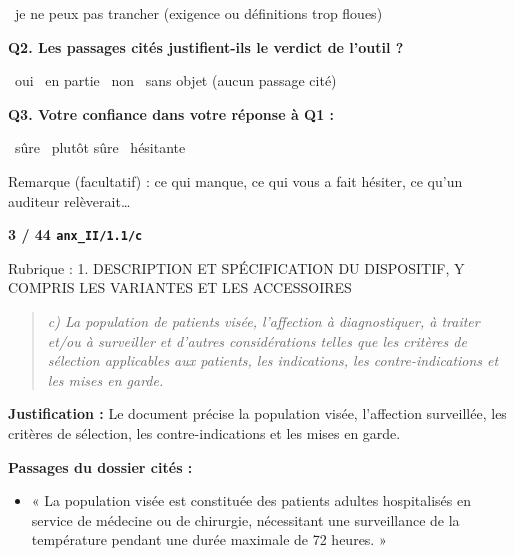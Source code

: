 \documentclass[11pt,a4paper]{article}
\newcommand{\rub}[1]{\par\medskip{\bfseries\color{gris}#1}\par}
\begin{document}
\begin{Form}
\CheckBox[name=u2_indecis,width=1.05em,height=1.05em,bordercolor={0 0 0},borderwidth=1]{}~je ne peux pas trancher (exigence ou définitions trop floues)\par
\textbf{Q2. Les passages cités justifient-ils le verdict de l'outil ?}\par
\CheckBox[name=u2_cit_oui,width=1.05em,height=1.05em,bordercolor={0 0 0},borderwidth=1]{}~oui \quad \CheckBox[name=u2_cit_partiel,width=1.05em,height=1.05em,bordercolor={0 0 0},borderwidth=1]{}~en partie \quad \CheckBox[name=u2_cit_non,width=1.05em,height=1.05em,bordercolor={0 0 0},borderwidth=1]{}~non \quad \CheckBox[name=u2_cit_sans,width=1.05em,height=1.05em,bordercolor={0 0 0},borderwidth=1]{}~sans objet (aucun passage cité)\par
\textbf{Q3. Votre confiance dans votre réponse à Q1 :}\par
\CheckBox[name=u2_conf_sure,width=1.05em,height=1.05em,bordercolor={0 0 0},borderwidth=1]{}~sûre \quad \CheckBox[name=u2_conf_plutot,width=1.05em,height=1.05em,bordercolor={0 0 0},borderwidth=1]{}~plutôt sûre \quad \CheckBox[name=u2_conf_hesitante,width=1.05em,height=1.05em,bordercolor={0 0 0},borderwidth=1]{}~hésitante\par
Remarque (facultatif) : ce qui manque, ce qui vous a fait hésiter, ce qu'un auditeur relèverait\ldots\par
\TextField[name=u2_note,multiline=true,width=\linewidth,height=2.2cm,bordercolor={0.6 0.6 0.6},borderwidth=0.5]{}
\newpage
{\Large\bfseries 3 / 44 \quad \texttt{anx\_II/1.1/c}}\par
{\small\color{gris} Rubrique : 1. DESCRIPTION ET SPÉCIFICATION DU DISPOSITIF, Y COMPRIS LES VARIANTES ET LES ACCESSOIRES}\par
\rub{L'exigence}
\begin{quote}\itshape c) La population de patients visée, l’affection à diagnostiquer, à traiter et/ou à surveiller et d’autres considérations telles que les critères de sélection applicables aux patients, les indications, les contre-indications et les mises en garde.\end{quote}
\rub{La réponse de l'outil : conforme}
\textbf{Justification :} Le document précise la population visée, l'affection surveillée, les critères de sélection, les contre-indications et les mises en garde.\par
\textbf{Passages du dossier cités :}
\begin{itemize}
\item « La population visée est constituée des patients adultes hospitalisés en service de médecine ou de chirurgie, nécessitant une surveillance de la température pendant une durée maximale de 72 heures. »

\end{itemize}
\end{Form}
\end{document}
